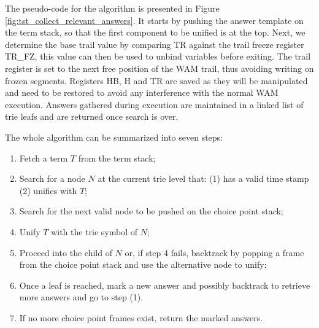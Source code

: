 The pseudo-code for the algorithm is presented in Figure \ref{fig:tst_collect_relevant_answers}.
It starts by pushing the answer template on the term stack, so that the first component to be unified is at the top. Next, we determine the base trail value by comparing TR against the trail freeze register TR\_FZ, this value can then be used to unbind variables before exiting. The trail register is set to the next free position of the WAM trail, thus avoiding writing on frozen segments. Registers HB, H and TR are saved as they will be manipulated and need to be restored to avoid any interference with the normal WAM execution. Answers gathered during execution are maintained in a linked list of trie leafs and are returned once search is over.

The whole algorithm can be summarized into seven steps:

\begin{enumerate}
  \item Fetch a term $T$ from the term stack;
  \item Search for a node $N$ at the current trie level that: (1) has a valid time stamp (2) unifies with $T$;
  \item Search for the next valid node to be pushed on the choice point stack;
  \item Unify $T$ with the trie symbol of $N$;
  \item Proceed into the child of $N$ or, if step 4 fails, backtrack by popping a frame from the choice point stack and use the alternative node to unify;
  \item Once a leaf is reached, mark a new answer and possibly backtrack to retrieve more answers and go to step (1).
  \item If no more choice point frames exist, return the marked answers.
\end{enumerate}

